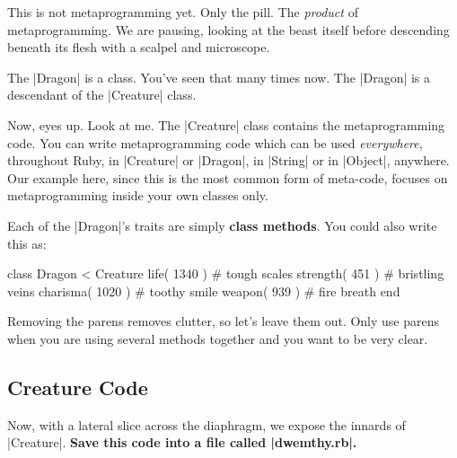 \documentclass[12pt,twoside]{report}
\begin{document}
This is not metaprogramming yet.  Only the pill.  The {\em product} of
metaprogramming.  We are pausing, looking at the beast itself before
descending beneath its flesh with a scalpel and microscope.

The \rubyinline|Dragon| is a class.  You've seen that
many times now.  The \rubyinline|Dragon| is a
descendant of the \rubyinline|Creature| class.

Now, eyes up.  Look at me.  The \rubyinline|Creature|
class contains the metaprogramming code.  You can write
metaprogramming code which can be used {\em everywhere}, throughout
Ruby, in \rubyinline|Creature| or
\rubyinline|Dragon|, in
\rubyinline|String| or in
\rubyinline|Object|, anywhere. Our example here, since
this is the most common form of meta-code, focuses on metaprogramming
inside your own classes only.

Each of the \rubyinline|Dragon|'s traits are simply
{\bf class methods}.  You could also write this as:


\begin{rubycode}

 class Dragon < Creature
   life( 1340 )     # tough scales
   strength( 451 )  # bristling veins
   charisma( 1020 ) # toothy smile
   weapon( 939 )    # fire breath
 end

\end{rubycode}


Removing the parens removes clutter, so let's leave them out.  Only
use parens when you are using several methods together and you want to
be very clear.



\subsection{Creature Code}



Now, with a lateral slice across the diaphragm, we expose the innards
of \rubyinline|Creature|.  {\bf Save this code into a
  file called \rubyinline|dwemthy.rb|.}
\end{document}
